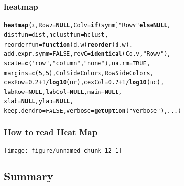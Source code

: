 \documentclass[UTF8]{beamer}\usepackage[]{graphicx}\usepackage[]{color}
\makeatletter
\newcommand{\hlnum}[1]{\textcolor[rgb]{0.686,0.059,0.569}{#1}}%
\newcommand{\hlstr}[1]{\textcolor[rgb]{0.192,0.494,0.8}{#1}}%
\newcommand{\hlopt}[1]{\textcolor[rgb]{0,0,0}{#1}}%
\newcommand{\hlstd}[1]{\textcolor[rgb]{0.345,0.345,0.345}{#1}}%
\newcommand{\hlkwa}[1]{\textcolor[rgb]{0.161,0.373,0.58}{\textbf{#1}}}%
\newcommand{\hlkwc}[1]{\textcolor[rgb]{0.333,0.667,0.333}{#1}}%
\newcommand{\hlkwd}[1]{\textcolor[rgb]{0.737,0.353,0.396}{\textbf{#1}}}%
\newenvironment{kframe}{%
 \def\at@end@of@kframe{}%
 \ifinner\ifhmode%
  \def\at@end@of@kframe{\end{minipage}}%
  \begin{minipage}{\columnwidth}%
 \fi\fi%
 \def\FrameCommand##1{\hskip\@totalleftmargin \hskip-\fboxsep
 \colorbox{shadecolor}{##1}\hskip-\fboxsep
     \hskip-\linewidth \hskip-\@totalleftmargin \hskip\columnwidth}%
 \MakeFramed {\advance\hsize-\width
   \@totalleftmargin\z@ \linewidth\hsize
   \@setminipage}}%
 {\par\unskip\endMakeFramed%
 \at@end@of@kframe}
\newenvironment{knitrout}{}{} %
\makeatother
\begin{document}
\begin{frame}[fragile]
  \frametitle{heatmap}
\small
\begin{knitrout}
\color{fgcolor}\begin{kframe}
\begin{alltt}
 \hlkwd{heatmap}\hlstd{(x,} \hlkwc{Rowv} \hlstd{=} \hlkwa{NULL}\hlstd{,} \hlkwc{Colv} \hlstd{=} \hlkwa{if}\hlstd{(symm)}\hlstr{"Rowv"} \hlkwa{else NULL}\hlstd{,}
 \hlkwc{distfun} \hlstd{= dist,} \hlkwc{hclustfun} \hlstd{= hclust,}
 \hlkwc{reorderfun} \hlstd{=} \hlkwa{function}\hlstd{(}\hlkwc{d}\hlstd{,} \hlkwc{w}\hlstd{)} \hlkwd{reorder}\hlstd{(d, w),}
 \hlstd{add.expr,} \hlkwc{symm} \hlstd{=} \hlnum{FALSE}\hlstd{,} \hlkwc{revC} \hlstd{=} \hlkwd{identical}\hlstd{(Colv,} \hlstr{"Rowv"}\hlstd{),}
 \hlkwc{scale} \hlstd{=} \hlkwd{c}\hlstd{(}\hlstr{"row"}\hlstd{,} \hlstr{"column"}\hlstd{,} \hlstr{"none"}\hlstd{),} \hlkwc{na.rm} \hlstd{=} \hlnum{TRUE}\hlstd{,}
 \hlkwc{margins} \hlstd{=} \hlkwd{c}\hlstd{(}\hlnum{5}\hlstd{,} \hlnum{5}\hlstd{), ColSideColors, RowSideColors,}
 \hlkwc{cexRow} \hlstd{=} \hlnum{0.2} \hlopt{+} \hlnum{1}\hlopt{/}\hlkwd{log10}\hlstd{(nr),} \hlkwc{cexCol} \hlstd{=} \hlnum{0.2} \hlopt{+} \hlnum{1}\hlopt{/}\hlkwd{log10}\hlstd{(nc),}
 \hlkwc{labRow} \hlstd{=} \hlkwa{NULL}\hlstd{,} \hlkwc{labCol} \hlstd{=} \hlkwa{NULL}\hlstd{,} \hlkwc{main} \hlstd{=} \hlkwa{NULL}\hlstd{,}
 \hlkwc{xlab} \hlstd{=} \hlkwa{NULL}\hlstd{,} \hlkwc{ylab} \hlstd{=} \hlkwa{NULL}\hlstd{,}
 \hlkwc{keep.dendro} \hlstd{=} \hlnum{FALSE}\hlstd{,} \hlkwc{verbose} \hlstd{=} \hlkwd{getOption}\hlstd{(}\hlstr{"verbose"}\hlstd{), ...)}
\end{alltt}
\end{kframe}
\end{knitrout}
\end{frame}

\begin{frame}[fragile]
  \frametitle{How to read Heat Map}

\begin{knitrout}
\color{fgcolor}

{\centering \texttt{[image: figure/unnamed-chunk-12-1]} 

}



\end{knitrout}
\end{frame}


\subsection{Summary}
\end{document}
